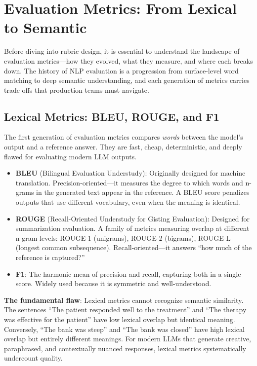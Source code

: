 \section{Evaluation Metrics: From Lexical to Semantic}
\label{sec:eval-metrics}

Before diving into rubric design, it is essential to understand the landscape of evaluation metrics---how they evolved, what they measure, and where each breaks down. The history of NLP evaluation is a progression from surface-level word matching to deep semantic understanding, and each generation of metrics carries trade-offs that production teams must navigate.

\subsection{Lexical Metrics: BLEU, ROUGE, and F1}

The first generation of evaluation metrics compares \emph{words} between the model's output and a reference answer. They are fast, cheap, deterministic, and deeply flawed for evaluating modern LLM outputs.

\begin{itemize}[leftmargin=*]
    \item \textbf{BLEU} (Bilingual Evaluation Understudy): Originally designed for machine translation. Precision-oriented---it measures the degree to which words and n-grams in the generated text appear in the reference. A BLEU score penalizes outputs that use different vocabulary, even when the meaning is identical.
    \item \textbf{ROUGE} (Recall-Oriented Understudy for Gisting Evaluation): Designed for summarization evaluation. A family of metrics measuring overlap at different n-gram levels: ROUGE-1 (unigrams), ROUGE-2 (bigrams), ROUGE-L (longest common subsequence). Recall-oriented---it answers ``how much of the reference is captured?''
    \item \textbf{F1}: The harmonic mean of precision and recall, capturing both in a single score. Widely used because it is symmetric and well-understood.
\end{itemize}

\textbf{The fundamental flaw}: Lexical metrics cannot recognize semantic similarity. The sentences ``The patient responded well to the treatment'' and ``The therapy was effective for the patient'' have low lexical overlap but identical meaning. Conversely, ``The bank was steep'' and ``The bank was closed'' have high lexical overlap but entirely different meanings. For modern LLMs that generate creative, paraphrased, and contextually nuanced responses, lexical metrics systematically undercount quality.

